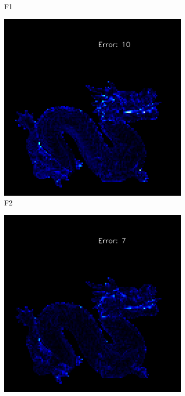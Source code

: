 \begin{figure}
\begin{subfigure}[b]{0.18\linewidth}
		\caption{F1}
	\end{subfigure}
	\begin{subfigure}[b]{0.18\linewidth}
		\includegraphics[width=\linewidth]{./Figures/gcnn_synthetic/fancy_eval_7_error_f2.png}
		\caption{F2}
	\end{subfigure}
	\begin{subfigure}[b]{0.18\linewidth}
		\includegraphics[width=\linewidth]{./Figures/gcnn_synthetic/fancy_eval_7_error_f3.png}

\end{subfigure}
\end{figure}
